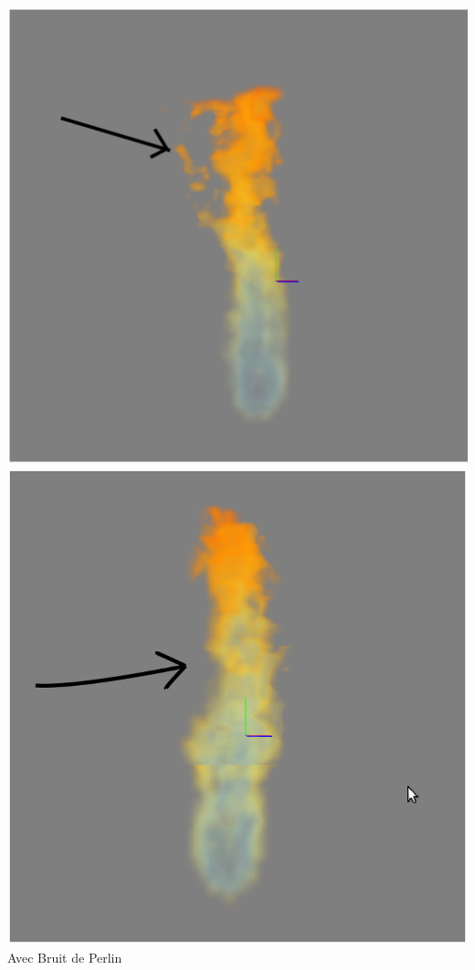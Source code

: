 \documentclass[a4paper,10pt]{article}
\begin{document}
\begin{center}
\includegraphics[scale=0.5]{Perlin1.ps}
\includegraphics[scale=0.5]{Perlin2.ps}\\
Avec Bruit de Perlin\\
\end{center}
\end{document}

